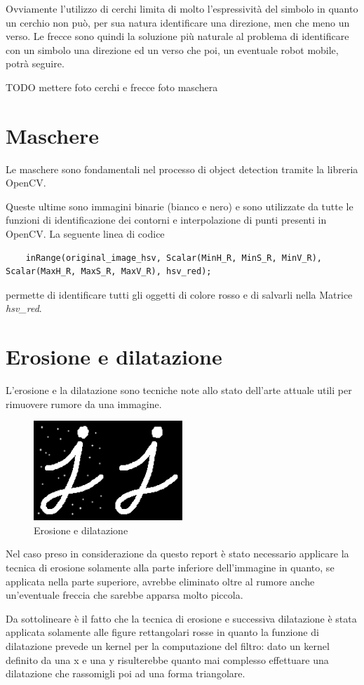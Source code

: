Ovviamente l'utilizzo di cerchi limita di molto l'espressività del simbolo in quanto un cerchio non può, per sua natura identificare una direzione, men che meno un verso.
Le frecce sono quindi la soluzione più naturale al problema di identificare con un simbolo una direzione ed un verso che poi, un eventuale robot mobile, potrà seguire.

TODO mettere foto cerchi e frecce
foto maschera

\section{Maschere}
Le maschere sono fondamentali nel processo di object detection tramite la libreria OpenCV.

Queste ultime sono immagini binarie (bianco e nero) e sono utilizzate da tutte le funzioni di identificazione dei contorni e interpolazione di punti presenti in OpenCV.
La seguente linea di codice

\begin{lstlisting}
	inRange(original_image_hsv, Scalar(MinH_R, MinS_R, MinV_R), Scalar(MaxH_R, MaxS_R, MaxV_R), hsv_red);
\end{lstlisting}

permette di identificare tutti gli oggetti di colore rosso e di salvarli nella Matrice \textit{hsv\_red}.

\section{Erosione e dilatazione}
L'erosione e la dilatazione sono tecniche note allo stato dell'arte attuale utili per rimuovere rumore da una immagine.

\begin{figure}[H]
	\centering
	\includegraphics[width=0.5\textwidth]{Immagini/erosion_dil.png}
	\caption{Erosione e dilatazione}
	\label{fig:erosion_dil}
\end{figure}

Nel caso preso in considerazione da questo report è stato necessario applicare la tecnica di erosione solamente alla parte inferiore dell'immagine in quanto, se applicata nella parte superiore, avrebbe eliminato oltre al rumore anche un'eventuale freccia che sarebbe apparsa molto piccola.

Da sottolineare è il fatto che la tecnica di erosione e successiva dilatazione è stata applicata solamente alle figure rettangolari rosse in quanto la funzione di dilatazione prevede un kernel per la computazione del filtro: dato un kernel definito da una x e una y risulterebbe quanto mai complesso effettuare una dilatazione che rassomigli poi ad una forma triangolare.